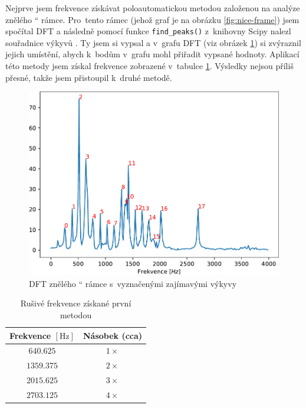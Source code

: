 \documentclass[a4paper, 11pt, final]{article}
\providecommand{\uv}[1]{\quotedblbase #1 \textquotedblleft}
\begin{document}
Nejprve jsem frekvence získávat poloautomatickou metodou založenou na analýze \uv{znělého} rámce. Pro~tento rámec (jehož graf je na obrázku \ref{fig:nice-frame}) jsem spočítal DFT a následně pomocí funkce \texttt{find\_peaks()} z~knihovny Scipy nalezl souřadnice výkyvů \cite{scipy-reference}. Ty jsem si vypsal a v~grafu DFT (viz obrázek \ref{fig:nice-frame-dft}) si zvýraznil jejich umístění, abych k~bodům v~grafu mohl přiřadit vypsané hodnoty. Aplikací této metody jsem získal frekvence zobrazené v~tabulce \ref{tab:freq-list-1st-method}. Výsledky nejsou příliš přesné, takže jsem přistoupil k~druhé metodě.

\begin{figure}[ht]
    \centering
    \includegraphics{img/05-nice-frame-dft.pdf}
    \caption{DFT \uv{znělého} rámce s~vyznačenými zajímavými výkyvy}
    \label{fig:nice-frame-dft}
\end{figure}

\begin{table}[ht]
    \centering
    \begin{tabular}{|c|c|}
        \hline
        \textbf{Frekvence $[\si{\hertz}]$} & \textbf{Násobek (cca)} \\
        \hline
        $640.625$ & $1\times$ \\
        $1359.375$ & $2\times$ \\
        $2015.625$ & $3\times$ \\
        $2703.125$ & $4\times$ \\
        \hline
    \end{tabular}
    \caption{Rušivé frekvence získané první metodou}
    \label{tab:freq-list-1st-method}
\end{table}
\end{document}
